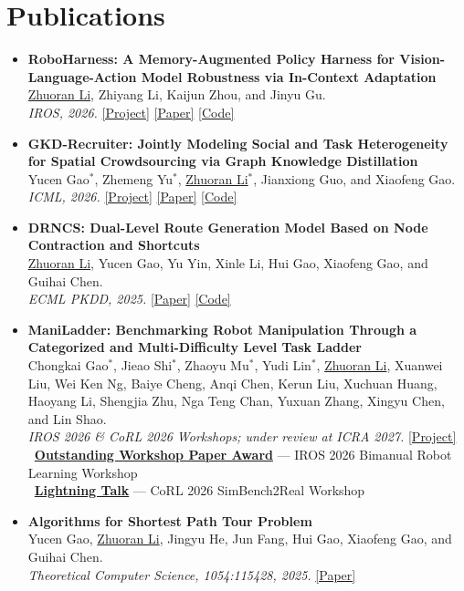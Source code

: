 \documentclass[a4paper,11pt]{article}
\newcommand{\publink}[2]{%
  \href{#1}{[#2]}%
}
\newcommand{\publication}[4]{%
  \item[] \textbf{#1}\\[-1pt]
  #2\\[-1pt]
  \textit{#3}\hspace{0.45em}#4
}
\begin{document}
\section{Publications}
\begin{itemize}[leftmargin=0pt,label={},itemsep=2.5pt,topsep=1pt]
  \publication
    {RoboHarness: A Memory-Augmented Policy Harness for Vision-Language-Action Model Robustness via In-Context Adaptation}
    {\underline{Zhuoran Li}, Zhiyang Li, Kaijun Zhou, and Jinyu Gu.}
    {IROS, 2026.}
    {\publink{https://lzy-1021.github.io/RoboHarness/}{Project}\hspace{0.35em}
     \publink{https://arxiv.org/abs/2603.24060}{Paper}\hspace{0.35em}
     \publink{https://github.com/LZY-1021/RoboHarness}{Code}}

  \publication
    {GKD-Recruiter: Jointly Modeling Social and Task Heterogeneity for Spatial Crowdsourcing via Graph Knowledge Distillation}
    {Yucen Gao$^{*}$, Zhemeng Yu$^{*}$, \underline{Zhuoran Li}$^{*}$, Jianxiong Guo, and Xiaofeng Gao.}
    {ICML, 2026.}
    {\publink{https://icml.cc/virtual/2026/poster/61673}{Project}\hspace{0.35em}
     \publink{https://openreview.net/forum?id=nsEtk9aFiZ}{Paper}\hspace{0.35em}
     \publink{https://github.com/GaoYucen/GKD-Recruiter}{Code}}

  \publication
    {DRNCS: Dual-Level Route Generation Model Based on Node Contraction and Shortcuts}
    {\underline{Zhuoran Li}, Yucen Gao, Yu Yin, Xinle Li, Hui Gao, Xiaofeng Gao, and Guihai Chen.}
    {ECML PKDD, 2025.}
    {\publink{https://link.springer.com/chapter/10.1007/978-3-032-06066-2_11}{Paper}\hspace{0.35em}
     \publink{https://github.com/iairplane/DRNCS}{Code}}

  \publication
    {ManiLadder: Benchmarking Robot Manipulation Through a Categorized and Multi-Difficulty Level Task Ladder}
    {Chongkai Gao$^{*}$, Jieao Shi$^{*}$, Zhaoyu Mu$^{*}$, Yudi Lin$^{*}$, \underline{Zhuoran Li}, Xuanwei Liu,
    Wei Ken Ng, Baiye Cheng, Anqi Chen, Kerun Liu, Xuchuan Huang, Haoyang Li, Shengjia Zhu,
    Nga Teng Chan, Yuxuan Zhang, Xingyu Chen, and Lin Shao.}
    {IROS 2026 \& CoRL 2026 Workshops; under review at ICRA 2027.}
    {\publink{https://maniladder.github.io/}{Project}\\[-1pt]
     \textcolor{accent}{\faTrophy}\
     \href{https://bimanual-robot-learning.github.io/}{\textbf{Outstanding Workshop Paper Award}}
     --- IROS 2026 Bimanual Robot Learning Workshop\\[-1pt]
     \textcolor{accent}{\faMicrophone}\
     \href{https://corl2026-realworld-robot-learning.github.io/}{\textbf{Lightning Talk}}
     --- CoRL 2026 SimBench2Real Workshop}

  \publication
    {Algorithms for Shortest Path Tour Problem}
    {Yucen Gao, \underline{Zhuoran Li}, Jingyu He, Jun Fang, Hui Gao, Xiaofeng Gao, and Guihai Chen.}
    {Theoretical Computer Science, 1054:115428, 2025.}
    {\publink{https://www.sciencedirect.com/science/article/pii/S0304397525003664}{Paper}}
\end{itemize}
\end{document}
